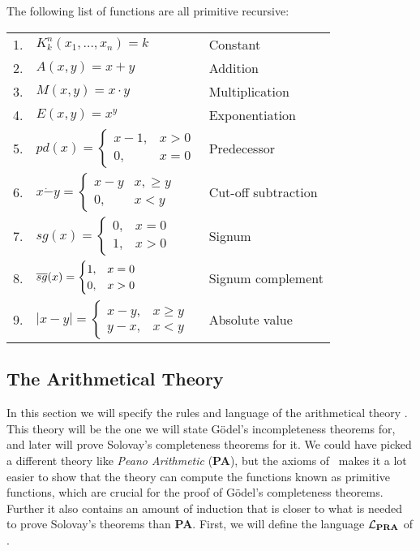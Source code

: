 \documentclass[../main.tex]{subfiles}
\begin{document}
\begin{prop}
	The following list of functions are all primitive recursive:
\begin{table}[!ht]
\begin{tabular}{p{1cm}p{6cm}p{5cm}}
	1.& $K^n_k(x_1,\ldots,x_n)=k$  & Constant  \\
	2.& $A(x,y)=x+y$ &Addition  \\
	3.&$M(x,y)=x\cdot y$  &Multiplication  \\
	4.&$E(x,y)=x^y$  &Exponentiation  \\
	5.&$pd(x)=\begin{cases}
		x-1, &x>0\\
		0,& x=0
	\end{cases}$&  Predecessor\\
		6.&$x\dot - y=\begin{cases}
			x-y&x,\geq y\\
			0,& x<y
		\end{cases}$  &Cut-off subtraction  \\
			7.&$sg(x)=\begin{cases}
				0,&x=0\\
				1,&x>0
			\end{cases}$& Signum \\
				8.& $\overline{sg}(x)=\begin{cases}
				1,&x=0\\
				0,&x>0
			\end{cases}$& Signum complement  \\
				9.& $|x-y|=\begin{cases}
				x-y,&x\geq y\\
				y-x,& x<y
			\end{cases}$& Absolute value  \\
\end{tabular}
\end{table}
\end{prop}

\subsection{The Arithmetical Theory \PRA}
In this section we will specify the rules and language of the arithmetical
theory \PRA. This theory will be the one we will state Gödel's incompleteness
theorems for, and later will  prove
Solovay's completeness theorems for it. We could have picked a different theory
like \textit{Peano Arithmetic} (\textbf{PA}), but the axioms of \PRA\ makes it a lot easier
to show that the theory can compute the functions known as primitive functions,
which are crucial for the proof of Gödel's completeness theorems. Further it
also contains an amount of induction that is closer to what is needed to prove
Solovay's theorems than \textbf{PA}. First, we
will define the language $\mathcal{L}_{\text{\textbf{PRA}}}$ of \PRA.
\end{document}
